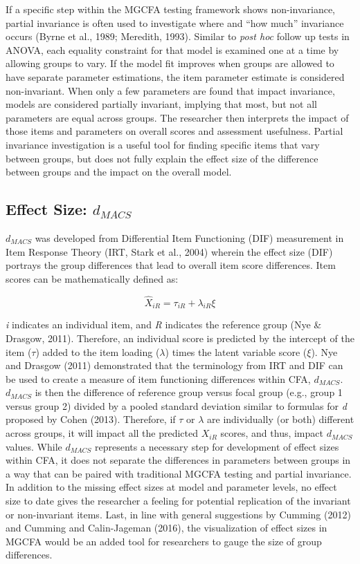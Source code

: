 \documentclass[
  man]{apa7}
\begin{document}
If a specific step within the MGCFA testing framework shows non-invariance, partial invariance is often used to investigate where and ``how much'' invariance occurs (Byrne et al., 1989; Meredith, 1993). Similar to \emph{post hoc} follow up tests in ANOVA, each equality constraint for that model is examined one at a time by allowing groups to vary. If the model fit improves when groups are allowed to have separate parameter estimations, the item parameter estimate is considered non-invariant. When only a few parameters are found that impact invariance, models are considered partially invariant, implying that most, but not all parameters are equal across groups. The researcher then interprets the impact of those items and parameters on overall scores and assessment usefulness. Partial invariance investigation is a useful tool for finding specific items that vary between groups, but does not fully explain the effect size of the difference between groups and the impact on the overall model.

\subsection{\texorpdfstring{Effect Size: \(d_{MACS}\)}{Effect Size: d\_\{MACS\}}}\label{effect-size-d_macs}

\(d_{MACS}\) was developed from Differential Item Functioning (DIF) measurement in Item Response Theory (IRT, Stark et al., 2004) wherein the effect size (DIF) portrays the group differences that lead to overall item score differences. Item scores can be mathematically defined as:

\[
\hat{X}_{iR} = \tau_{iR} + \lambda_{iR}\xi
\]

\emph{i} indicates an individual item, and \emph{R} indicates the reference group (Nye \& Drasgow, 2011). Therefore, an individual score is predicted by the intercept of the item (\(\tau\)) added to the item loading (\(\lambda\)) times the latent variable score (\(\xi\)). Nye and Drasgow (2011) demonstrated that the terminology from IRT and DIF can be used to create a measure of item functioning differences within CFA, \(d_{MACS}\). \(d_{MACS}\) is then the difference of reference group versus focal group (e.g., group 1 versus group 2) divided by a pooled standard deviation similar to formulas for \emph{d} proposed by Cohen (2013). Therefore, if \(\tau\) or \(\lambda\) are individually (or both) different across groups, it will impact all the predicted \(X_{iR}\) scores, and thus, impact \(d_{MACS}\) values. While \(d_{MACS}\) represents a necessary step for development of effect sizes within CFA, it does not separate the differences in parameters between groups in a way that can be paired with traditional MGCFA testing and partial invariance. In addition to the missing effect sizes at model and parameter levels, no effect size to date gives the researcher a feeling for potential replication of the invariant or non-invariant items. Last, in line with general suggestions by Cumming (2012) and Cumming and Calin-Jageman (2016), the visualization of effect sizes in MGCFA would be an added tool for researchers to gauge the size of group differences.
\end{document}
